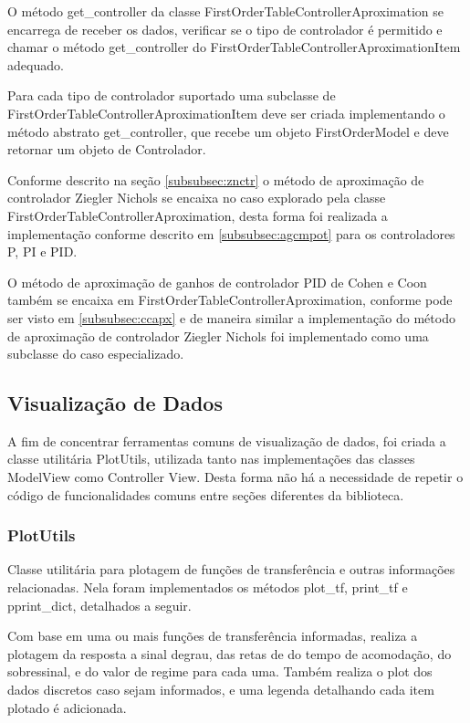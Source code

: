 O método get\_controller da classe FirstOrderTableControllerAproximation se encarrega de receber os dados, verificar
se o tipo de controlador é permitido e chamar o método get\_controller do FirstOrderTableControllerAproximationItem
adequado.

Para cada tipo de controlador suportado uma subclasse de FirstOrderTableControllerAproximationItem deve ser criada
implementando o método abstrato get\_controller, que recebe um objeto FirstOrderModel e deve retornar um objeto de
Controlador.


Conforme descrito na seção \ref{subsubsec:znctr} o método de aproximação de controlador Ziegler Nichols se encaixa no
caso explorado pela classe FirstOrderTableControllerAproximation, desta forma foi realizada a implementação conforme
descrito em \ref{subsubsec:agcmpot} para os controladores P, PI e PID\@.


O método de aproximação de ganhos de controlador PID de Cohen e Coon também se encaixa em
FirstOrderTableControllerAproximation, conforme pode ser visto em \ref{subsubsec:ccapx} e de maneira similar a
implementação do método de aproximação de controlador Ziegler Nichols foi implementado como uma subclasse do caso
especializado.

\subsection{Visualização de Dados}\label{subsec:dataviz}

A fim de concentrar ferramentas comuns de visualização de dados, foi criada a classe utilitária PlotUtils, utilizada
tanto nas implementações das classes ModelView como Controller View.
Desta forma não há a necessidade de repetir o código de funcionalidades comuns entre seções diferentes da biblioteca.

\subsubsection{PlotUtils}
Classe utilitária para plotagem de funções de transferência e outras informações relacionadas.
Nela foram implementados os métodos plot\_tf, print\_tf e pprint\_dict, detalhados a seguir.

Com base em uma ou mais funções de transferência informadas, realiza a plotagem da resposta a sinal degrau, das retas de
do tempo de acomodação, do sobressinal, e do valor de regime para cada uma.
Também realiza o plot dos dados discretos caso sejam informados, e uma legenda detalhando cada item plotado é
adicionada.

